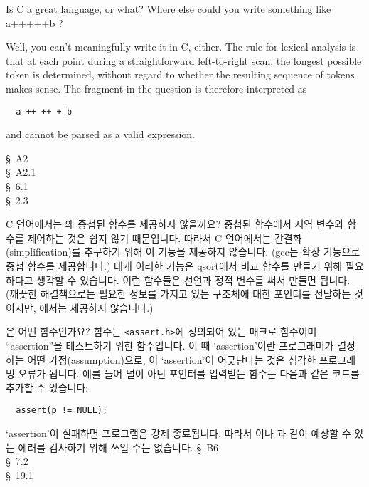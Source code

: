 \begin{faq}
	Is C a great language, or what?  Where else could you write
	something like a+++++b ?

\A
	Well, you can't meaningfully write it in C, either.
	The rule for lexical analysis is that at each point during a
	straightforward left-to-right scan, the longest possible token
	is determined, without regard to whether the resulting sequence
	of tokens makes sense.   The fragment in the question is
	therefore interpreted as
\begin{verbatim}
  a ++ ++ + b
\end{verbatim}
	and cannot be parsed as a valid expression.

\R
	\cite{kr1} \S\ A2  \\
	\cite{kr2} \S\ A2.1  \\ 
	\cite{c89} \S\ 6.1 \\
	\cite{hs} \S\ 2.3 
\end{faq}

\begin{faq}
	C 언어에서는 왜 중첩된 함수를 제공하지 않을까요?
\A
	중첩된 함수에서 지역 변수와 함수를 제어하는 것은 쉽지 않기
	때문입니다.  따라서 C 언어에서는 간결화(simplification)를
	추구하기 위해 이 기능을 제공하지 않습니다.  (gcc는 확장 기능으로
	중첩 함수를 제공합니다.) 대개 이러한 기능은 qsort에서
	비교 함수를 만들기 위해 필요하다고 생각할 수 있습니다.
	이런 함수들은  선언과 정적 변수를 써서 만들면
	됩니다.  (깨끗한 해결책으로는 필요한 정보를 가지고 있는
	구조체에 대한 포인터를 전달하는 것이지만, 에서는
	제공하지 않습니다.)
\end{faq}

\begin{faq}
	은 어떤 함수인가요?
\A
	 함수는 \verb+<assert.h>+에 정의되어 있는 매크로
        함수이며
	``assertion''을 테스트하기 위한 함수입니다.  이 때 `assertion'이란
	프로그래머가 결정하는 어떤 가정(assumption)으로, 이 `assertion'이
	어긋난다는 것은 심각한 프로그래밍 오류가 됩니다.  예를 들어
	널이 아닌 포인터를 입력받는 함수는 다음과 같은 코드를 추가할
	수 있습니다:
\begin{verbatim}
  assert(p != NULL);
\end{verbatim}
	\noindent `assertion'이 실패하면 프로그램은 강제 종료됩니다.
	따라서 이나 과 같이 예상할 수 있는 에러를
	검사하기 위해 쓰일 수는 없습니다.
\R
	\cite{kr2} \S\ B6  \\
	\cite{c89} \S\ 7.2 \\
	\cite{hs} \S\ 19.1 
\end{faq}

